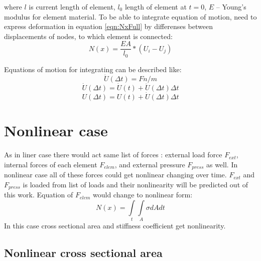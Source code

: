 \documentclass[12pt]{report}
\begin{document}
where $l$ is current length of element, $l_0$ length of element at $t=0$, $E$ – Young’s modulus for element material.
To be able to integrate equation of motion, need to express deformation in equation \eqref{eqn:NxFull} by differenses 
between displacements of nodes, to which element is connected:
\begin{equation}\label{eqn:NxWdispl}
  N(x)=\frac{EA}{l_0}*(U_{i}-U_{j})
\end{equation}\par
Equations of motion for integrating can be described like:
\begin{equation}\label{eqn:Accel}
  \ddot{U}(\Delta t)=Fn/m
\end{equation}
\begin{equation}\label{eqn:Velos}
  \dot{U}(\Delta t)=\dot{U}(t)+\ddot{U}(\Delta t)\Delta t
\end{equation}
\begin{equation}\label{eqn:Displ}
  U(\Delta t)=U(t)+\dot{U}(\Delta t)\Delta t
\end{equation}
\section{Nonlinear case}
As in liner case there would act same list of forces : external load force $F_{ext}$,
internal forces of each element $F_{elem}$, and external pressure $F_{press}$ as well. In nonlinear case all 
of these forces could get nonlinear changing over time. $F_{ext}$ and $F_{press}$ is 
loaded from list of loads and their nonlinearity will be predicted out of this work. Equation of $F_{elem}$ would change to nonlinear form:
\begin{equation}\label{eqn:nNx}
  N(x)= \int\limits_t\int\limits_A \sigma dAdt
\end{equation}
In this case cross sectional area and stiffness coefficient get nonlinearity. \par
\subsection{Nonlinear cross sectional area}\par
\end{document}
